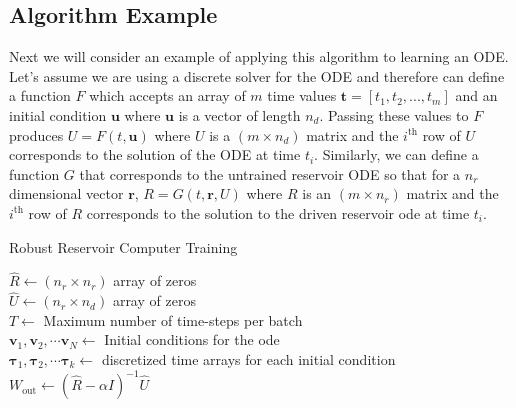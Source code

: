 \documentclass{article}
\begin{document}
\subsection*{Algorithm Example}
Next we will consider an example of applying this algorithm to learning an ODE. Let's assume we are using a discrete solver for the ODE and therefore can define a function $F$ which accepts an array of $m$ time values $\mathbf{t} = [t_1, t_2, ..., t_m]$ and an initial condition $\mathbf{u}$ where $\mathbf{u}$ is a vector of length $n_d$. 
Passing these values to $F$ produces $U = F(t, \mathbf{u})$ where $U$ is a $(m \times n_d)$ matrix and the $i^\text{th}$ row of $U$ corresponds to the solution of the ODE at time $t_i$. 
Similarly, we can define a function $G$ that corresponds to the untrained reservoir ODE so that for a $n_r$ dimensional vector $\mathbf{r}$, $R = G(t, \mathbf{r}, U)$ where $R$ is an $(m \times n_r)$ matrix and the $i^\text{th}$ row of $R$ corresponds to the solution to the driven reservoir ode at time $t_i$.
 
\begin{algorithm}[H]
 \caption{Robust Reservoir Computer Training}
\SetAlgoLined
{}
 $\hat{R} \leftarrow (n_r \times n_r)$ array of zeros \\
 $\hat{U} \leftarrow (n_r \times n_d)$ array of zeros \\
 $T \leftarrow$ Maximum number of time-steps per batch \\
 $\mathbf{v}_1, \mathbf{v}_2, \cdots \mathbf{v}_N \leftarrow$ Initial conditions for the ode\\
 $ \mathbf{\tau}_1, \mathbf{\tau}_2, \cdots \mathbf{\tau}_k \leftarrow$ discretized time arrays for each initial condition \\
 $W_\text{out} \leftarrow (\hat{R} - \alpha I)^{-1} \hat{U}$\\
\end{algorithm}
\end{document}
